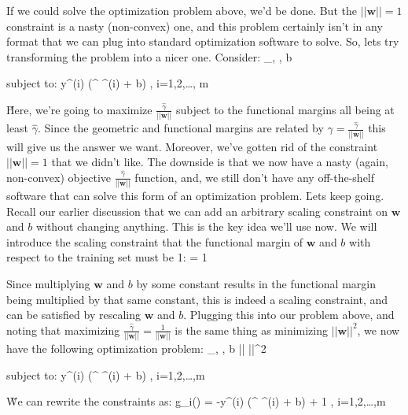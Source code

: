 If we could solve the optimization problem above, we'd be done. But the $|| \boldsymbol{w} || = 1$ constraint is a
nasty (non-convex) one, and this problem certainly isn't in any format that we can plug into standard optimization
software to solve. So, lets try transforming the problem into a nicer one. Consider:
\bse
\max_{\gamma, , b} 
\ese

subject to:
\bse
y^{(i)} (^{\intercal} ^{(i)} + b) \geq \hat{\gamma}, \:\:\: i=1,2,\ldots, m
\ese

\v

Here, we're going to maximize $\frac{\hat{\gamma}}{|| \boldsymbol{w} ||}$ subject to the functional margins all being
at least $\hat{\gamma}$. Since the geometric and functional margins are related by $\gamma = \frac{\hat{\gamma}}{||
\boldsymbol{w} ||}$ this will give us the answer we want. Moreover, we've gotten rid of the constraint $||
\boldsymbol{w} || = 1$ that we didn't like. The downside is that we now have a nasty (again, non-convex) objective
$\frac{\hat{\gamma}}{|| \boldsymbol{w} ||}$ function, and, we still don't have any off-the-shelf software that can
solve this form of an optimization problem. \v

Lets keep going. Recall our earlier discussion that we can add an arbitrary scaling constraint on $\boldsymbol{w}$
and $b$ without changing anything. This is the key idea we'll use now. We will introduce the scaling constraint that
the functional margin of $\boldsymbol{w}$ and $b$ with respect to the training set must be 1:
\bse
\hat{\gamma} = 1
\ese

Since multiplying $\boldsymbol{w}$ and $b$ by some constant results in the functional margin being multiplied by that
same constant, this is indeed a scaling constraint, and can be satisfied by rescaling $\boldsymbol{w}$ and $b$.
Plugging this into our problem above, and noting that maximizing $\frac{\hat{\gamma}}{|| \boldsymbol{w} ||} =
\frac{1}{|| \boldsymbol{w} ||} $ is the same thing as minimizing $|| \boldsymbol{w} ||^2$, we now have the following
optimization problem:
\bse
\min_{\gamma, , b}  ||  ||^2
\ese

subject to:
\bse
y^{(i)} (^{\intercal} ^{(i)} + b) , \:\:\: i=1,2,\ldots,m
\ese

\v

We can rewrite the constraints as:
\bse
g_{i}() = -y^{(i)} (^{\intercal} ^{(i)} + b) + 1 , \:\:\: i=1,2,\ldots,m
\ese

